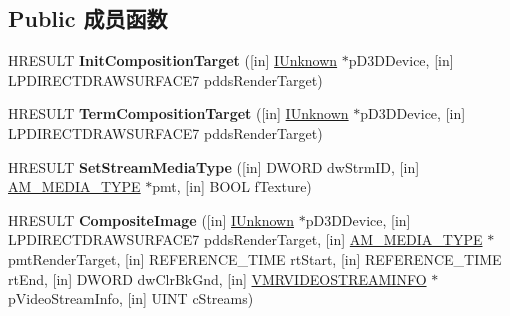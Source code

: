 \subsection*{Public 成员函数}
\begin{DoxyCompactItemize}
\item 
\mbox{\label{interface_i_v_m_r_image_compositor_a67133893de9d35b84736611d935add33}} 
H\+R\+E\+S\+U\+LT {\bfseries Init\+Composition\+Target} (\mbox{[}in\mbox{]} \hyperlink{interface_i_unknown}{I\+Unknown} $\ast$p\+D3\+D\+Device, \mbox{[}in\mbox{]} L\+P\+D\+I\+R\+E\+C\+T\+D\+R\+A\+W\+S\+U\+R\+F\+A\+C\+E7 pdds\+Render\+Target)
\item 
\mbox{\label{interface_i_v_m_r_image_compositor_a7b74a5f903a56e645bfd0efb8ff0f95c}} 
H\+R\+E\+S\+U\+LT {\bfseries Term\+Composition\+Target} (\mbox{[}in\mbox{]} \hyperlink{interface_i_unknown}{I\+Unknown} $\ast$p\+D3\+D\+Device, \mbox{[}in\mbox{]} L\+P\+D\+I\+R\+E\+C\+T\+D\+R\+A\+W\+S\+U\+R\+F\+A\+C\+E7 pdds\+Render\+Target)
\item 
\mbox{\label{interface_i_v_m_r_image_compositor_a9f7dedba917dc6b5358235d749148e44}} 
H\+R\+E\+S\+U\+LT {\bfseries Set\+Stream\+Media\+Type} (\mbox{[}in\mbox{]} D\+W\+O\+RD dw\+Strm\+ID, \mbox{[}in\mbox{]} \hyperlink{struct_a_m___m_e_d_i_a___t_y_p_e}{A\+M\+\_\+\+M\+E\+D\+I\+A\+\_\+\+T\+Y\+PE} $\ast$pmt, \mbox{[}in\mbox{]} B\+O\+OL f\+Texture)
\item 
\mbox{\label{interface_i_v_m_r_image_compositor_a0aa4a6236388199a36b22ce77a0754fb}} 
H\+R\+E\+S\+U\+LT {\bfseries Composite\+Image} (\mbox{[}in\mbox{]} \hyperlink{interface_i_unknown}{I\+Unknown} $\ast$p\+D3\+D\+Device, \mbox{[}in\mbox{]} L\+P\+D\+I\+R\+E\+C\+T\+D\+R\+A\+W\+S\+U\+R\+F\+A\+C\+E7 pdds\+Render\+Target, \mbox{[}in\mbox{]} \hyperlink{struct_a_m___m_e_d_i_a___t_y_p_e}{A\+M\+\_\+\+M\+E\+D\+I\+A\+\_\+\+T\+Y\+PE} $\ast$pmt\+Render\+Target, \mbox{[}in\mbox{]} R\+E\+F\+E\+R\+E\+N\+C\+E\+\_\+\+T\+I\+ME rt\+Start, \mbox{[}in\mbox{]} R\+E\+F\+E\+R\+E\+N\+C\+E\+\_\+\+T\+I\+ME rt\+End, \mbox{[}in\mbox{]} D\+W\+O\+RD dw\+Clr\+Bk\+Gnd, \mbox{[}in\mbox{]} \hyperlink{struct___v_m_r_v_i_d_e_o_s_t_r_e_a_m_i_n_f_o}{V\+M\+R\+V\+I\+D\+E\+O\+S\+T\+R\+E\+A\+M\+I\+N\+FO} $\ast$p\+Video\+Stream\+Info, \mbox{[}in\mbox{]} U\+I\+NT c\+Streams)

\end{DoxyCompactItemize}
